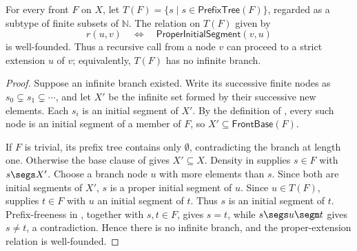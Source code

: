 \begin{lemma}
For every front $F$ on $X$, let
$T(F)=\{s\mid s\in\mathsf{PrefixTree}(F)\}$, regarded as a subtype of
finite subsets of $\mathbb N$.  The relation on $T(F)$ given by
\[
  r(u,v)\quad\Longleftrightarrow\quad
  \mathsf{ProperInitialSegment}(v,u)
\]
is well-founded.  Thus a recursive call from a node $v$ can proceed to a
strict extension $u$ of $v$; equivalently, $T(F)$ has no infinite branch.
\end{lemma}
\begin{proof}
Suppose an infinite branch existed.  Write its successive finite nodes as
$s_0\subsetneq s_1\subsetneq\cdots$, and let $X'$ be the infinite set formed
by their successive new elements.  Each $s_i$ is an initial segment of $X'$.
By the definition of , every such node is an initial
segment of a member of $F$, so $X'\subseteq\mathsf{FrontBase}(F)$.

If $F$ is trivial, its prefix tree contains only $\emptyset$, contradicting
the branch at length one.  Otherwise the base clause of  gives
$X'\subseteq X$.  Density in  supplies $s\in F$ with
 $s\segs X'$.  Choose a branch node $u$ with more elements than $s$.
 Since both are initial segments of $X'$, $s$ is a proper initial segment of
 $u$.  Since $u\in T(F)$,
 supplies $t\in F$ with $u$ an initial segment of $t$.
Thus $s$ is an initial segment of $t$.  Prefix-freeness in
, together with $s,t\in F$, gives $s=t$, while
$s\segs u\segm t$ gives $s\ne t$, a contradiction.  Hence there is no
infinite branch, and the proper-extension relation is well-founded.
\end{proof}
